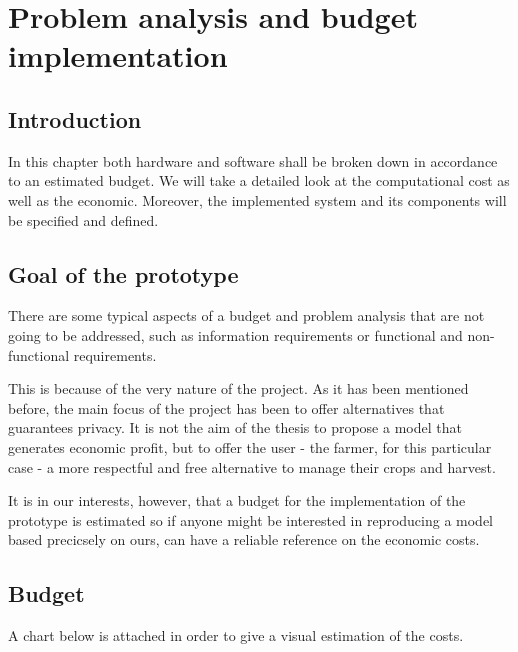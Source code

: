 \chapter{Problem analysis and budget implementation}\label{cap:analisis}

\section{Introduction}
In this chapter both hardware and software shall be broken down in accordance to an estimated budget. We will take a detailed look at the computational cost as well as the economic. Moreover, the implemented system and its components will be specified and defined.

\section{Goal of the prototype}
There are some typical aspects of a budget and problem analysis that are not going to be addressed, such as information requirements or functional and non-functional requirements.

This is because of the very nature of the project. As it has been mentioned before, the main focus of the project has been to offer alternatives that guarantees privacy. It is not the aim of the thesis to propose a model that generates economic profit, but to offer the user - the farmer, for this particular case - a more respectful and free alternative to manage their crops and harvest.

It is in our interests, however, that a budget for the implementation of the prototype is estimated so if anyone might be interested in reproducing a model based precicsely on ours, can have a reliable reference on the economic costs.

\section{Budget}
A chart below is attached in order to give a visual estimation of the costs.

